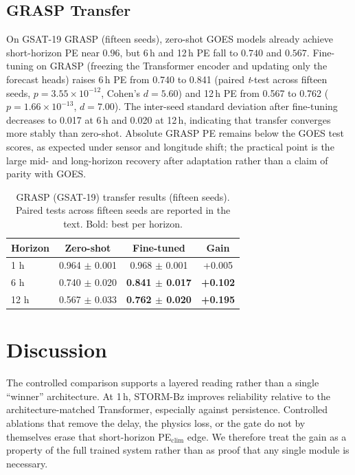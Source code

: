 \documentclass{ieeeaccess}
\begin{document}
\subsection{GRASP Transfer}
On GSAT-19 GRASP (fifteen seeds), zero-shot GOES models already achieve
short-horizon PE near \(0.96\), but 6\,h and 12\,h PE fall to
\(0.740\) and \(0.567\). Fine-tuning on GRASP (freezing the Transformer
encoder and updating only the forecast heads) raises 6\,h PE from 0.740
to 0.841 (paired \textit{t}-test across fifteen seeds,
\(p = 3.55\times10^{-12}\), Cohen's \(d = 5.60\))
and 12\,h PE from 0.567 to 0.762
(\(p = 1.66\times10^{-13}\), \(d = 7.00\)).
The inter-seed standard deviation after fine-tuning decreases to 0.017 at 6\,h
and 0.020 at 12\,h, indicating that transfer converges more stably than zero-shot.
Absolute GRASP PE remains below
the GOES test scores, as expected under sensor and longitude shift; the
practical point is the large mid- and long-horizon recovery after
adaptation rather than a claim of parity with GOES.

\begin{table}[!htbp]
\centering
\caption{GRASP (GSAT-19) transfer results (fifteen seeds). Paired tests across fifteen seeds are reported in the text. Bold: best per horizon.}
\label{tab:grasp}
\begin{tabular}{lccc}
\toprule
Horizon & Zero-shot & Fine-tuned & Gain \\
\midrule
1 h  & 0.964 \(\pm\) 0.001 & 0.968 \(\pm\) 0.001 & +0.005 \\
6 h  & 0.740 \(\pm\) 0.020 & \textbf{0.841 \(\pm\) 0.017} & \textbf{+0.102} \\
12 h & 0.567 \(\pm\) 0.033 & \textbf{0.762 \(\pm\) 0.020} & \textbf{+0.195} \\
\bottomrule
\end{tabular}
\end{table}


\section{Discussion}
\label{sec:discussion}
The controlled comparison supports a layered reading rather than a single
``winner'' architecture. At 1\,h, STORM-Bz improves reliability relative to the architecture-matched Transformer, especially against persistence. Controlled ablations that remove the delay, the physics loss, or the gate do not by themselves erase that short-horizon PE\(_{\mathrm{clim}}\) edge. We therefore treat the gain as a property of the full trained system rather than as proof that any single module is necessary.
\end{document}
